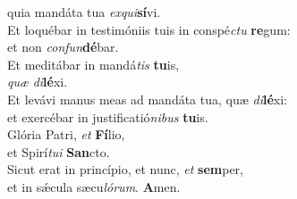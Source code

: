 \oddverse quia mandáta tua \textit{ex}\textit{qui}\textbf{sí}vi.\\
\evenverse Et loquébar in testimóniis tuis in conspé\textit{ctu} \textbf{re}gum:~\*\\
\evenverse et non \textit{con}\textit{fun}\textbf{dé}bar.\\
\oddverse Et meditábar in mandá\textit{tis} \textbf{tu}is,~\*\\
\oddverse \textit{quæ} \textit{di}\textbf{lé}xi.\\
\evenverse Et levávi manus meas ad mandáta tua, quæ \textit{di}\textbf{lé}xi:~\*\\
\evenverse et exercébar in justificatió\textit{ni}\textit{bus} \textbf{tu}is.\\
\oddverse Glória Patri, \textit{et} \textbf{Fí}lio,~\*\\
\oddverse et Spirí\textit{tu}\textit{i} \textbf{San}cto.\\
\evenverse Sicut erat in princípio, et nunc, \textit{et} \textbf{sem}per,~\*\\
\evenverse et in sǽcula sæcu\textit{ló}\textit{rum}. \textbf{A}men.\\
